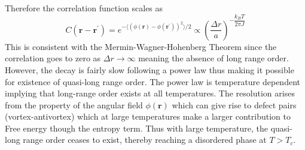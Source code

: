 \documentclass[aps,prb,onecolumn,notitlepage,showpacs,floatfix,superscriptaddress]{revtex4-1}
\begin{document}
Therefore the correlation function scales as
\begin{equation}
C({\bm r}-{\bm r}^\prime) = e^{-\langle \left( \phi({\bm r})-\phi({\bm r}^\prime)\right)^2 \rangle/2} \propto \left( \dfrac{\Delta r}{a}\right)^{-\dfrac{k_B T}{2\pi J}}
\end{equation}
This is consistent with the Mermin-Wagner-Hohenberg Theorem since the correlation goes to zero as $\Delta r \rightarrow \infty$ meaning the absence of long range order. However, the decay is fairly slow following a power law thus making it possible for existence of quasi-long range order. The power law is temperature dependent implying that long-range order exists at all temperatures. The resolution arises from the property of the angular field $\phi({\bm r})$ which can give rise to defect pairs (vortex-antivortex) which at large temperatures make a larger contribution to Free energy though the entropy term. Thus with large temperature, the quasi-long range order ceases to exist, thereby reaching a disordered phase at $T>T_c$.
\end{document}
